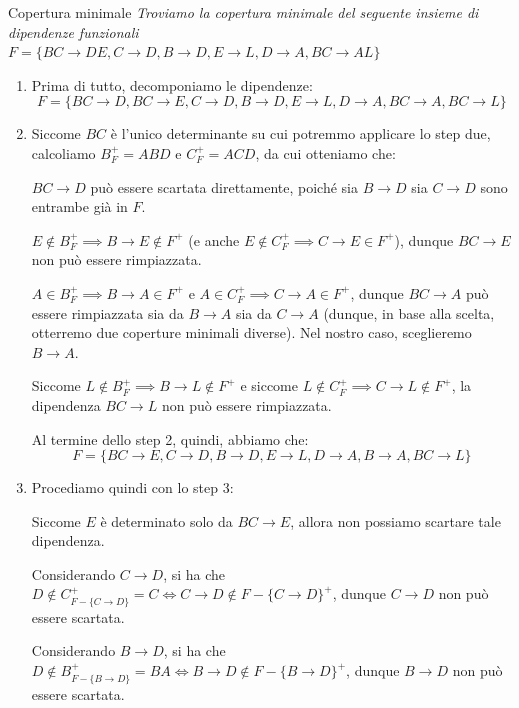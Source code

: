 \begin{Example}{Copertura minimale}{}
    \textit{Troviamo la copertura minimale del seguente insieme di dipendenze funzionali $F = \{BC\to DE, C\to D, B\to D, E\to L, D\to A, BC\to AL\}$}

    \begin{enumerate}
        \item Prima di tutto, decomponiamo le dipendenze:
        \begin{equation*}
            F = \{BC\to D, BC\to E, C\to D, B\to D, E\to L, D\to A, BC\to A, BC\to L\}
        \end{equation*}

        \item Siccome $BC$ è l'unico determinante su cui potremmo applicare lo step due, calcoliamo $B^+_F = ABD$ e $C^+_F = ACD$, da cui otteniamo che:
        
        $BC\to D$ può essere scartata direttamente, poiché sia $B\to D$ sia $C\to D$ sono entrambe già in $F$. 
        
        $E\notin B^+_F\implies B\to E\notin F^+$ (e anche $E\notin C^+_F\implies C\to E\in  F^+$), dunque $BC\to E$ non può essere rimpiazzata. 
        
        $A\in  B^+_F\implies B\to A\in  F^+$ e $A\in  C^+_F\implies C\to A\in  F^+$, dunque $BC\to A$ può essere rimpiazzata sia da $B\to A$ sia da $C\to A$ (dunque, in base alla scelta, otterremo due coperture minimali diverse). Nel nostro caso, sceglieremo $B\to A$. 
        
        Siccome $L\notin B^+_F\implies B\to L\notin F^+$ e siccome $L\notin C^+_F\implies C\to L\notin F^+$, la dipendenza $BC\to L$ non può essere rimpiazzata.
        
        Al termine dello step 2, quindi, abbiamo che:
        \begin{equation*}
            F = \{BC\to E, C\to D, B\to D, E\to L, D\to A, B\to A, BC\to L\}
        \end{equation*}

        \item Procediamo quindi con lo step 3:
        
    Siccome $E$ è determinato solo da $BC\to E$, allora non possiamo scartare tale dipendenza.
    
    Considerando $C\to D$, si ha che $D\notin C^+_{F-\{C\to D\}} = C \iff  C\to D\notin F-\{C\to D\}^+$, dunque $C\to D$ non può essere scartata.
    
    Considerando $B\to D$, si ha che $D\notin B^+_{F-\{B\to D\}} = BA \iff  B\to D\notin F-\{B\to D\}^+$, dunque $B\to D$ non può essere scartata.
    

\end{enumerate}
\end{Example}
